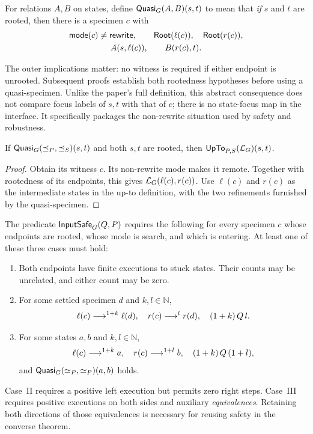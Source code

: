 \begin{definition}\label{term:quasi}
For relations $A,B$ on states, define $\mathsf{Quasi}_G(A,B)(s,t)$ to mean that
\emph{if} $s$ and $t$ are rooted, then there is a specimen $c$ with
\[
 \begin{gathered}
 \mathsf{mode}(c)\ne\mathsf{rewrite},\qquad
 \mathsf{Root}(\ell(c)),\quad\mathsf{Root}(r(c)),\\
 A(s,\ell(c)),\qquad B(r(c),t).
 \end{gathered}
\]
\end{definition}
The outer implications matter: no witness is required if either endpoint
is unrooted. Subsequent proofs establish both rootedness hypotheses before
using a quasi-specimen. Unlike the paper's full definition, this abstract
consequence does not compare focus labels of $s,t$ with that of $c$;
there is no state-focus map in the interface. It specifically packages the
non-rewrite situation used by safety and robustness.

\begin{lemma}
If $\mathsf{Quasi}_G(\preceq_P,\preceq_S)(s,t)$ and both $s,t$ are rooted, then
$\mathsf{UpTo}_{P,S}(\mathcal L_G)(s,t)$.
\end{lemma}
\begin{proof}
Obtain its witness $c$. Its non-rewrite mode makes it remote. Together
with rootedness of its endpoints, this gives $\mathcal L_G(\ell(c),r(c))$.
Use $\ell(c)$ and $r(c)$ as the intermediate states in the up-to
definition, with the two refinements furnished by the quasi-specimen.
\end{proof}

\begin{definition}\label{term:safety}
The predicate $\mathsf{InputSafe}_G(Q,P)$ requires the following for every specimen $c$
whose endpoints are rooted, whose mode is search, and which is entering.
At least one of these three cases must hold:
\begin{enumerate}[label=\textup{(\Roman*)}]
\item Both endpoints have finite executions to stuck states. Their counts
  may be unrelated, and either count may be zero.
\item For some settled specimen $d$ and $k,l\in\mathbb N$,
  \[
    \ell(c)\mathrel{\longrightarrow^{1+k}}\ell(d),\quad r(c)\mathrel{\longrightarrow^{l}}r(d),\quad
    (1+k)\,Q\,l.
  \]
\item For some states $a,b$ and $k,l\in\mathbb N$,
  \[
    \ell(c)\mathrel{\longrightarrow^{1+k}}a,\quad r(c)\mathrel{\longrightarrow^{1+l}}b,\quad
    (1+k)\,Q\,(1+l),
  \]
  and $\mathsf{Quasi}_G(\simeq_P,\simeq_P)(a,b)$ holds.
\end{enumerate}
\end{definition}
Case~II requires a positive left execution but permits zero right steps.
Case~III requires positive executions on both sides and auxiliary
\emph{equivalences}. Retaining both directions of those equivalences is
necessary for reusing safety in the converse theorem.

